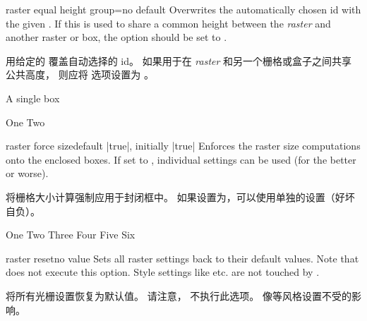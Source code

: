\begin{docTcbKey}[][doc new=2014-11-10]{raster equal height group}{=}{no default}
Overwrites the automatically chosen id with the given .
If this is used to share a common height between the \emph{raster} and
another raster or box, the  option
should be set to .

用给定的  覆盖自动选择的 id。 如果用于在 \emph{raster} 和另一个栅格或盒子之间共享公共高度， 则应将  选项设置为 。
\begin{dispExample}
\begin{tcolorbox}[equal height group=raster-manual-id]
A single box
\end{tcolorbox}
\begin{tcbitemize}[raster equal height,raster equal height group=raster-manual-id]
\tcbitem One
\tcbitem \Huge Two
\end{tcbitemize}
\end{dispExample}
\end{docTcbKey}



\begin{docTcbKey}[][doc new=2014-11-10]{raster force size}{}{default |true|, initially |true|}
Enforces the raster size computations onto the enclosed boxes.
If set to , individual settings can be used (for the better or worse).

将栅格大小计算强制应用于封闭框中。 如果设置为，可以使用单独的设置（好坏自负）。
\begin{dispExample}
\begin{tcbitemize}[raster force size=false, raster halign=center,
size=small,colframe=red!50!black,colback=red!10!white]
\tcbitem One
\tcbitem Two
\tcbitem[add to width=-3cm] Three
\tcbitem[add to width=-3cm] Four
\tcbitem[add to width=-3cm] Five
\tcbitem[add to width=3cm] Six
\end{tcbitemize}
\end{dispExample}
\end{docTcbKey}



\begin{docTcbKey}[][doc new=2014-11-10]{raster reset}{}{no value}
Sets all raster settings back to their default values.
Note that  does not execute this option.
Style settings like  etc. are not
touched by .

将所有光栅设置恢复为默认值。 请注意， 不执行此选项。 像等风格设置不受的影响。
\end{docTcbKey}

